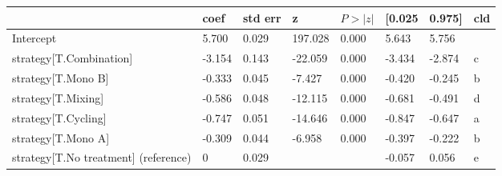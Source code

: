 \begin{tabular}{llllllll}
\toprule
 & coef & std err & z & $P>|z|$ & [0.025 & 0.975] & cld \\
\midrule
Intercept & 5.700 & 0.029 &   197.028 &  0.000 & 5.643 & 5.756 &  \\
strategy[T.Combination] & -3.154 & 0.143 &   -22.059 &  0.000 & -3.434 & -2.874 & c \\
strategy[T.Mono B] & -0.333 & 0.045 &    -7.427 &  0.000 & -0.420 & -0.245 & b \\
strategy[T.Mixing] & -0.586 & 0.048 &   -12.115 &  0.000 & -0.681 & -0.491 & d \\
strategy[T.Cycling] & -0.747 & 0.051 &   -14.646 &  0.000 & -0.847 & -0.647 & a \\
strategy[T.Mono A] & -0.309 & 0.044 &    -6.958 &  0.000 & -0.397 & -0.222 & b \\
strategy[T.No treatment] (reference) & 0 & 0.029 &  &  & -0.057 & 0.056 & e \\
\bottomrule
\end{tabular}
